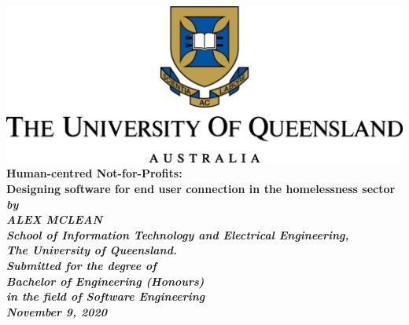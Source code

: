 \begin{titlepage}
    \renewcommand{\baselinestretch}{1.0}
    \begin{center}
        \includegraphics{assets/uq.png}\\
        \vspace*{35mm}
        \Huge\bf
        Human-centred Not-for-Profits:\\
        Designing software for end user connection in the homelessness sector\\
        \vspace{20mm}
        \large\sl
        by\\
        ALEX MCLEAN
        \medskip\\
        \rm
        School of Information Technology and Electrical Engineering,\\
        The University of Queensland.\\
        \vspace{30mm}
        Submitted for the degree of\\
        Bachelor of Engineering (Honours)
        \smallskip\\
        \normalsize
        in the field of Software Engineering
        \medskip\\
        \large
        November 9, 2020
    \end{center}
\end{titlepage}

\cleardoublepage